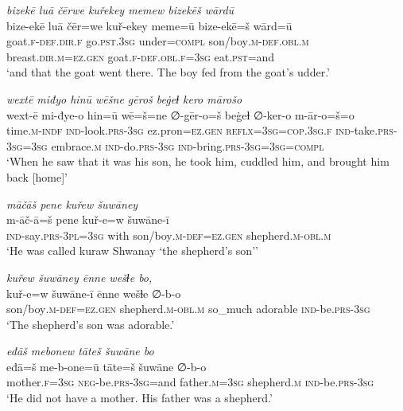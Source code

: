 \ea \label{KŠ.31}
\textit{bizekē luā čērwe kuřekey memew bizekēš wārdū} \\ 
\gll bize-ekē luā čēr=we kuř-ekey meme=ū bize-ekē=š wārd=ū \\ 
 goat\textsc{.f}\textsc{-def}\textsc{.dir}\textsc{.f} go\textsc{.pst}\textsc{.3sg} under\textsc{=compl} son/boy\textsc{.m}\textsc{-def}\textsc{.obl}\textsc{.m} breast\textsc{.dir}\textsc{.m}\textsc{=ez.gen} goat\textsc{.f}\textsc{-def}\textsc{.obl}\textsc{.f}\textsc{=3sg} eat\textsc{.pst}=and \\ 
\glt `and that the goat went there. The boy fed from the goat’s udder.'
\z 
 
\ea \label{KŠ.32}
\textit{wextē miđyo hinū wēšne gēroš beġeɫ kero mārošo} \\ 
\gll wext-ē mi-đye-o hin=ū wē=š=ne ∅-gēr-o=š beġeɫ ∅-ker-o m-ār-o=š=o \\ 
 time\textsc{.m}\textsc{-indf} \textsc{ind-}look\textsc{.prs}\textsc{-3sg} ez.pron\textsc{=ez.gen} \textsc{reflx}\textsc{=3sg}\textsc{=cop}\textsc{.3sg}\textsc{.f} \textsc{ind-}take\textsc{.prs}\textsc{-3sg}\textsc{=3sg} embrace\textsc{.m} \textsc{ind-}do\textsc{.prs}\textsc{-3sg} \textsc{ind-}bring\textsc{.prs}\textsc{-3sg}\textsc{=3sg}\textsc{=compl} \\ 
\glt `When he saw that it was his son, he took him, cuddled him, and brought him back [home]'
\z 
 
\ea \label{KŠ.33}
\textit{māčāš pene kuřew šuwāney} \\ 
\gll m-āč-ā=š pene kuř-e=w šuwāne-ī \\ 
 \textsc{ind-}say\textsc{.prs}\textsc{-3pl}\textsc{=3sg} with son/boy\textsc{.m}\textsc{-def}\textsc{=ez.gen} shepherd\textsc{.m}\textsc{-obl}\textsc{.m} \\ 
\glt `He was called kuraw Shwanay ‘the shepherd’s son’'
\z 
 
\ea \label{KŠ.34}
\textit{kuřew šuwāney ēnne wešɫe bo,} \\ 
\gll kuř-e=w šuwāne-ī ēnne wešɫe ∅-b-o \\ 
 son/boy\textsc{.m}\textsc{-def}\textsc{=ez.gen} shepherd\textsc{.m}\textsc{-obl}\textsc{.m} so\_much adorable \textsc{ind-}be\textsc{.prs}\textsc{-3sg} \\ 
\glt `The shepherd’s son was adorable.'
\z 
 
\ea \label{KŠ.35}
\textit{eđāš mebonew tāteš šuwāne bo} \\ 
\gll eđā=š me-b-one=ū tāte=š šuwāne ∅-b-o \\ 
 mother\textsc{.f}\textsc{=3sg} \textsc{neg-}be\textsc{.prs}\textsc{-3sg}=and father\textsc{.m}\textsc{=3sg} shepherd\textsc{.m} \textsc{ind-}be\textsc{.prs}\textsc{-3sg} \\ 
\glt `He did not have a mother. His father was a shepherd.'
\z 
 
